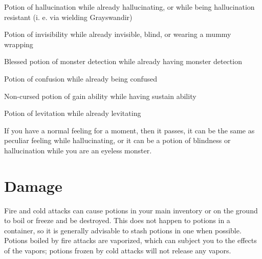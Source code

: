 \begin{myitemize}\item{}Potion of hallucination\footnotemark[231] while already hallucinating, or while being hallucination resistant (i. e. via wielding Grayswandir\footnotemark[232])
\item{}Potion of invisibility\footnotemark[233] while already invisible, blind, or wearing a mummy wrapping\footnotemark[234]
\item{}Blessed potion of monster detection\footnotemark[235] while already having monster detection
\item{}Potion of confusion\footnotemark[236] while already being confused
\item{}Non-{}cursed potion of gain ability\footnotemark[237] while having sustain ability\footnotemark[238]
\item{}Potion of levitation\footnotemark[239] while already levitating
\end{myitemize}

If you have a normal feeling for a moment, then it passes, it can be the same as peculiar feeling while hallucinating, or it can be a potion of blindness or hallucination while you are an eyeless monster.



\section{Damage}
\label{11}
Fire and cold attacks can cause potions in your main inventory or on the ground to boil or freeze and be destroyed. This does not happen to potions in a container\footnotemark[240], so it is generally advisable to stash potions in one when possible. Potions boiled by fire attacks are vaporized, which can subject you to the effects of the vapors\footnotemark[241]; potions frozen by cold attacks will not release any vapors.



